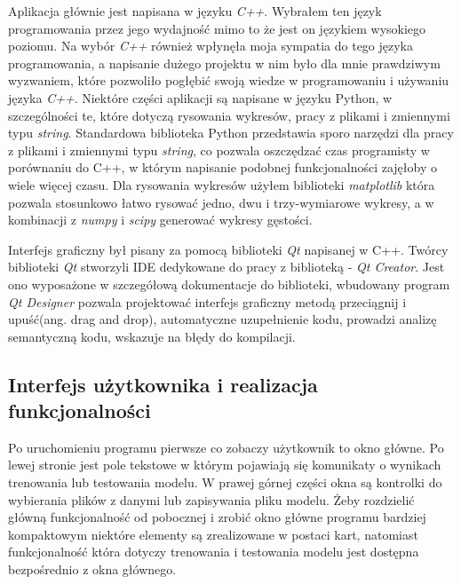 \documentclass[paper=a4, fontsize=11pt]{scrartcl} %
\numberwithin{equation}{section} %
\numberwithin{figure}{section} %
\begin{document}
    \par Aplikacja głównie jest napisana w języku \textit{C++}. Wybrałem ten język
    programowania przez jego wydajność mimo to że jest on językiem wysokiego poziomu. Na wybór
    \textit{C++} również wpłynęła moja sympatia do tego języka programowania, a napisanie
    dużego projektu w nim było dla mnie prawdziwym wyzwaniem, które pozwoliło pogłębić swoją
    wiedze w programowaniu i używaniu języka \textit{C++}.  Niektóre części aplikacji są
    napisane w języku Python, w szczególności te, które dotyczą rysowania wykresów, pracy z
    plikami i zmiennymi typu \textit{string}. Standardowa biblioteka Python przedstawia sporo
    narzędzi dla pracy z plikami i zmiennymi typu \textit{string}, co pozwala oszczędzać czas
    programisty w porównaniu do C++, w którym napisanie podobnej funkcjonalności zajęłoby o
    wiele więcej czasu. Dla rysowania wykresów użyłem biblioteki \textit{matplotlib}
    \cite{matplotlib} która pozwala stosunkowo łatwo rysować jedno, dwu i trzy-wymiarowe
    wykresy, a w kombinacji z \textit{numpy} i \textit{scipy} generować wykresy gęstości.
    \par Interfejs graficzny był pisany za pomocą biblioteki \textit{Qt}
    \cite{qtlibrary} napisanej w C++.  Twórcy biblioteki \textit{Qt} stworzyli IDE dedykowane
    do pracy z biblioteką - \textit{Qt Creator}. Jest ono wyposażone w szczegółową dokumentacje
    do biblioteki, wbudowany program \textit{Qt Designer} pozwala projektować interfejs
    graficzny metodą przeciągnij i upuść(ang. drag and drop), automatyczne uzupełnienie kodu,
    prowadzi analizę semantyczną kodu, wskazuje na błędy do kompilacji.  

\subsection{Interfejs użytkownika i realizacja funkcjonalności}
    \par Po uruchomieniu programu pierwsze co zobaczy użytkownik to okno główne. Po lewej
    stronie jest pole tekstowe w którym pojawiają się komunikaty o wynikach trenowania lub
    testowania modelu. W prawej górnej części okna są kontrolki do wybierania plików z danymi
    lub zapisywania pliku modelu. Żeby rozdzielić główną funkcjonalność od pobocznej i zrobić
    okno główne programu bardziej kompaktowym niektóre elementy są zrealizowane w postaci kart,
    natomiast funkcjonalność która dotyczy trenowania i testowania modelu jest
    dostępna bezpośrednio z okna głównego.
\end{document}
